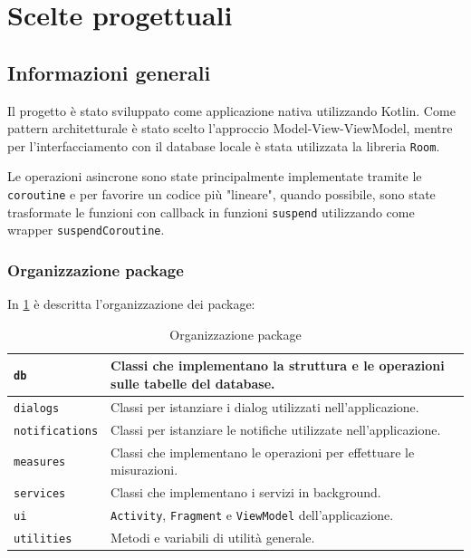 \documentclass[11pt]{article}
\begin{document}
\section{Scelte progettuali}

\subsection{Informazioni generali}
Il progetto è stato sviluppato come applicazione nativa utilizzando Kotlin. 
Come pattern architetturale è stato scelto l'approccio Model-View-ViewModel, mentre per l'interfacciamento con il database locale è stata utilizzata la libreria \texttt{Room}.

Le operazioni asincrone sono state principalmente implementate tramite le \texttt{coroutine} e per favorire un codice più "lineare", quando possibile, sono state trasformate le funzioni con callback in funzioni \texttt{suspend} utilizzando come wrapper \texttt{suspendCoroutine}.

\subsubsection{Organizzazione package}
In \cref{table:packages} è descritta l'organizzazione dei package:
\begin{table}[H]
  \centering
  \begin{tabular}{ | m{8em} | m{10cm} | } 
    \hline
    \texttt{db} & Classi che implementano la struttura e le operazioni sulle tabelle del database. \\ 
    \hline
    \texttt{dialogs} & Classi per istanziare i dialog utilizzati nell'applicazione. \\ 
    \hline
    \texttt{notifications} & Classi per istanziare le notifiche utilizzate nell'applicazione. \\ 
    \hline
    \texttt{measures} & Classi che implementano le operazioni per effettuare le misurazioni. \\ 
    \hline
    \texttt{services} & Classi che implementano i servizi in background. \\ 
    \hline
    \texttt{ui} & \texttt{Activity}, \texttt{Fragment} e \texttt{ViewModel} dell'applicazione. \\ 
    \hline
    \texttt{utilities} & Metodi e variabili di utilità generale. \\ 
    \hline
  \end{tabular}
  \caption{Organizzazione package}\label{table:packages}
\end{table}
\end{document}
